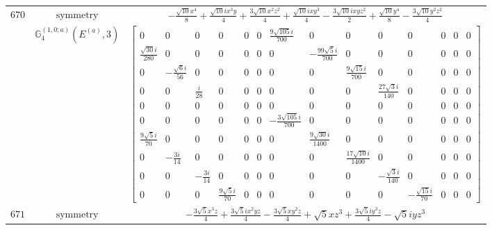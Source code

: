 \documentclass[fleqn,8pt,landscape]{jsarticle}
\begin{document}
\begin{longtable}{ccc}
$ 670 $ & $ \text{symmetry} $ & $ - \frac{\sqrt{10} x^{4}}{8} + \frac{\sqrt{10} i x^{3} y}{4} + \frac{3 \sqrt{10} x^{2} z^{2}}{4} + \frac{\sqrt{10} i x y^{3}}{4} - \frac{3 \sqrt{10} i x y z^{2}}{2} + \frac{\sqrt{10} y^{4}}{8} - \frac{3 \sqrt{10} y^{2} z^{2}}{4} $ \\
$  $ & $ \mathbb{G}_{4}^{(1,0;a)}(E^{(a)},3) $ & $ \begin{bmatrix} 0 & 0 & 0 & 0 & 0 & 0 & \frac{9 \sqrt{105} i}{700} & 0 & 0 & 0 & 0 & 0 & 0 & 0 \\ \frac{\sqrt{30} i}{280} & 0 & 0 & 0 & 0 & 0 & 0 & - \frac{99 \sqrt{5} i}{700} & 0 & 0 & 0 & 0 & 0 & 0 \\ 0 & - \frac{\sqrt{6} i}{56} & 0 & 0 & 0 & 0 & 0 & 0 & \frac{9 \sqrt{15} i}{700} & 0 & 0 & 0 & 0 & 0 \\ 0 & 0 & \frac{i}{28} & 0 & 0 & 0 & 0 & 0 & 0 & \frac{27 \sqrt{3} i}{140} & 0 & 0 & 0 & 0 \\ 0 & 0 & 0 & 0 & 0 & 0 & 0 & 0 & 0 & 0 & 0 & 0 & 0 & 0 \\ 0 & 0 & 0 & 0 & 0 & 0 & - \frac{3 \sqrt{105} i}{700} & 0 & 0 & 0 & 0 & 0 & 0 & 0 \\ \frac{9 \sqrt{5} i}{70} & 0 & 0 & 0 & 0 & 0 & 0 & \frac{9 \sqrt{30} i}{1400} & 0 & 0 & 0 & 0 & 0 & 0 \\ 0 & - \frac{3 i}{14} & 0 & 0 & 0 & 0 & 0 & 0 & \frac{17 \sqrt{10} i}{1400} & 0 & 0 & 0 & 0 & 0 \\ 0 & 0 & - \frac{3 i}{14} & 0 & 0 & 0 & 0 & 0 & 0 & - \frac{\sqrt{3} i}{140} & 0 & 0 & 0 & 0 \\ 0 & 0 & 0 & \frac{9 \sqrt{5} i}{70} & 0 & 0 & 0 & 0 & 0 & 0 & - \frac{\sqrt{15} i}{70} & 0 & 0 & 0 \end{bmatrix} $ \\ \hline
$ 671 $ & $ \text{symmetry} $ & $ - \frac{3 \sqrt{5} x^{3} z}{4} + \frac{3 \sqrt{5} i x^{2} y z}{4} - \frac{3 \sqrt{5} x y^{2} z}{4} + \sqrt{5} x z^{3} + \frac{3 \sqrt{5} i y^{3} z}{4} - \sqrt{5} i y z^{3} $ \\

\end{longtable}
\end{document}
